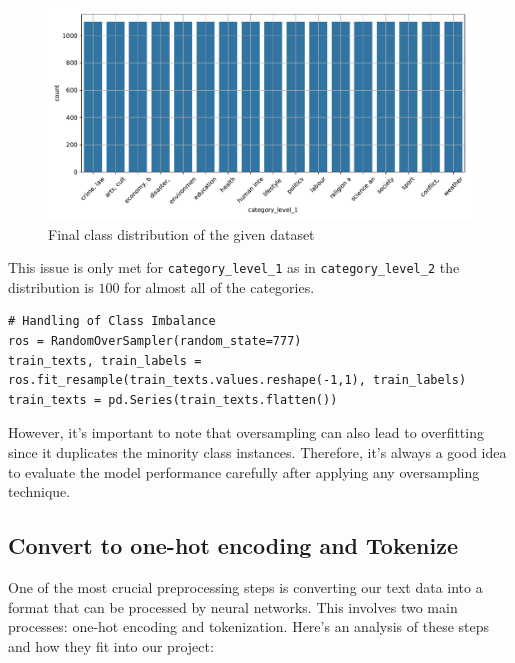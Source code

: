 \begin{figure}[htpb]
	\centering
	\includegraphics[width=\linewidth]{Images/final_class_distribution.pdf}
	\caption{Final class distribution of the given dataset}
	\label{fig:final_class_distribution}
\end{figure}

This issue is only met for \verb|category_level_1| as in \verb|category_level_2| the distribution is $100$ for almost all of the categories.\\

\begin{lstlisting}
# Handling of Class Imbalance
ros = RandomOverSampler(random_state=777)
train_texts, train_labels = ros.fit_resample(train_texts.values.reshape(-1,1), train_labels)
train_texts = pd.Series(train_texts.flatten())
\end{lstlisting}

However, it's important to note that oversampling can also lead to overfitting since it duplicates the minority class instances. Therefore, it's always a good idea to evaluate the model performance carefully after applying any oversampling technique.

\subsection{Convert to one-hot encoding and Tokenize}
One of the most crucial preprocessing steps is converting our text data into a format that can be processed by neural networks. This involves two main processes: one-hot encoding and tokenization. Here's an analysis of these steps and how they fit into our project: \\

